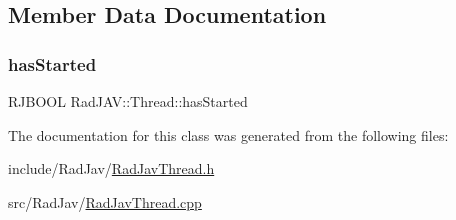 \subsection{Member Data Documentation}
\mbox{\label{class_rad_j_a_v_1_1_thread_a223e908c756b4ab2ed2b5d097e6764f3}} 
\subsubsection{\texorpdfstring{has\+Started}{hasStarted}}
{\footnotesize\ttfamily R\+J\+B\+O\+OL Rad\+J\+A\+V\+::\+Thread\+::has\+Started\hspace{0.3cm}{\ttfamily [protected]}}



The documentation for this class was generated from the following files\+:\begin{DoxyCompactItemize}
\item 
include/\+Rad\+Jav/\mbox{\hyperlink{_rad_jav_thread_8h}{Rad\+Jav\+Thread.\+h}}\item 
src/\+Rad\+Jav/\mbox{\hyperlink{_rad_jav_thread_8cpp}{Rad\+Jav\+Thread.\+cpp}}\end{DoxyCompactItemize}
